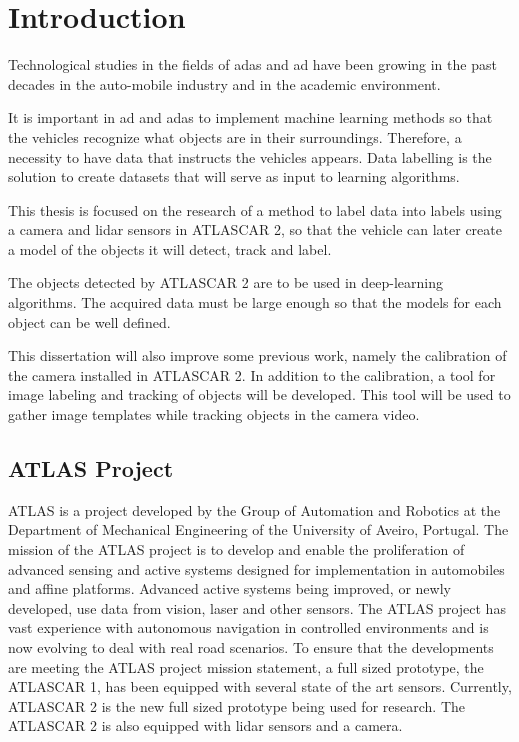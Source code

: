 \chapter{Introduction}
Technological studies in the fields of \gls{adas} and \gls{ad} have been growing in the past decades in the auto-mobile industry and in the academic environment. 

It is important in \gls{ad} and \gls{adas} to implement machine learning methods so that the vehicles recognize what objects are in their surroundings. Therefore, a necessity to have data that instructs the vehicles appears. Data labelling is the solution to create datasets that will serve as input to learning algorithms.

This thesis is focused on the research of a method to label data into labels using a camera and \gls{lidar} sensors in ATLASCAR 2, so that the vehicle can later create a model of the objects it will detect, track and label.

The objects detected by ATLASCAR 2 are to be used in deep-learning algorithms. The acquired data must be large enough so that the models for each object can be well defined.

This dissertation will also improve some previous work, namely the calibration of the camera installed in ATLASCAR 2. In addition to the calibration, a tool for image labeling and tracking of objects will be developed. This tool will be used to gather image templates while tracking objects in the camera video. 

\section{ATLAS Project}

ATLAS is a project developed by the Group of Automation and Robotics at the Department of Mechanical Engineering of the University of Aveiro, Portugal. The mission of the ATLAS project is to develop and enable the proliferation of advanced sensing and active systems designed for implementation in automobiles and affine platforms. Advanced active systems being improved, or newly developed, use data from vision, laser and other sensors. The ATLAS project has vast experience with autonomous navigation in controlled environments and is now evolving to deal with real road scenarios. To ensure that the developments are meeting the ATLAS project mission statement, a full sized prototype, the ATLASCAR 1, has been equipped with several state of the art sensors. \cite{LARlabs} Currently, ATLASCAR 2 is the new full sized prototype being used for research. The ATLASCAR 2 is also equipped with \gls{lidar} sensors and a camera.

